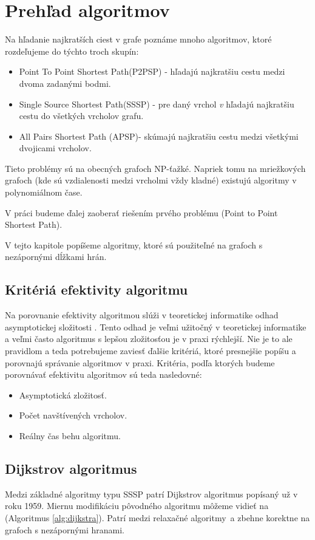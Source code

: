 \chapter{Prehľad algoritmov}
Na hľadanie najkratších ciest v grafe poznáme mnoho algoritmov, ktoré rozdeľujeme do týchto troch \cite{mares07} skupín: 


\begin{itemize}
\item Point To Point Shortest Path(P2PSP) - hľadajú najkratšiu cestu medzi dvoma zadanými bodmi.
\item Single Source Shortest Path(SSSP) - pre daný vrchol {\sl v} hľadajú najkratšiu cestu do všetkých vrcholov grafu.
\item All Pairs Shortest Path (APSP)- skúmajú najkratšiu cestu medzi všetkými dvojicami vrcholov.
\end{itemize}

Tieto problémy sú na obecných grafoch NP-ťažké.
Napriek tomu na mriežkových grafoch (kde sú vzdialenosti medzi vrcholmi vždy kladné) existujú algoritmy v polynomiálnom čase.

V práci budeme ďalej zaoberať riešením prvého problému (Point to Point Shortest Path). 

V tejto kapitole popíšeme algoritmy, ktoré sú použiteľné na grafoch s nezápornými dĺžkami hrán. 


\section{Kritériá efektivity algoritmu}
Na porovnanie efektivity algoritmou slúži v teoretickej informatike odhad asymptotickej složitosti \cite{asymptotic65}.
Tento odhad je veľmi užitočný v teoretickej informatike a veľmi často algoritmus s lepšou zložitosťou je v praxi rýchlejší.
Nie je to ale pravidlom a teda potrebujeme zaviesť ďalšie kritériá, ktoré presnejšie popíšu a porovnajú správanie algoritmov v praxi.
Kritéria, podľa ktorých budeme porovnávať efektivitu algoritmov sú teda nasledovné:
\begin{itemize}
	\item Asymptotická zložitosť.
	\item Počet navštívených vrcholov.
	\item Reálny čas behu algoritmu.
\end{itemize}



\section{Dijkstrov algoritmus}
Medzi základné algoritmy typu SSSP patrí Dijkstrov algoritmus \cite{dijkstra59} popísaný už v roku 1959. 
Miernu modifikáciu pôvodného algoritmu môžeme vidieť na (Algoritmus \ref{alg:dijkstra}). 
Patrí medzi relaxačné algoritmy~a zbehne korektne na grafoch
s nezápornými hranami.

